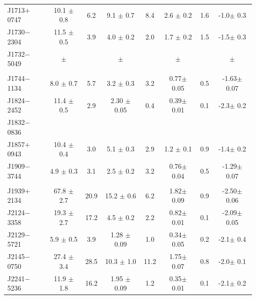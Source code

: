 \documentclass[useAMS,usenatbib]{mn2e}
\begin{document}
\begin{table}
\begin{tabular}{lccccccc}
 J1713$+$0747  &  10.1 $\pm$ 0.8  &  6.2   &  9.1  $\pm$ 0.7  &  8.4  &  2.6 $\pm$ 0.2  &  1.6  &  -1.0$\pm$ 0.3    \\
 J1730$-$2304  &  11.5 $\pm$ 0.5  &  3.9   &  4.0  $\pm$ 0.2  &  2.0  &  1.7 $\pm$ 0.2  &  1.5  &  -1.5$\pm$ 0.3    \\
 J1732$-$5049  &    $\pm$  &    &   $\pm$  &    &   $\pm$  &    &  $\pm$    \\
               &	                &        &                  &       &                 &       &                 \\
 J1744$-$1134  &  8.0  $\pm$ 0.7  &  5.7   &  3.2  $\pm$ 0.3  &  3.2  &  0.77$\pm$ 0.05 &  0.5  &  -1.63$\pm$ 0.07    \\
 J1824$-$2452  &  11.4 $\pm$ 0.5  &  2.9   &  2.30 $\pm$ 0.05 &  0.4  &  0.39$\pm$ 0.01 &  0.1  &  -2.3$\pm$ 0.2    \\
 J1832$-$0836  &	                &        &                  &       &                 &       &                 \\
 J1857$+$0943  &  10.4 $\pm$ 0.4  &  3.0   &  5.1  $\pm$ 0.3  &  2.9  &  1.2 $\pm$ 0.1  &  0.9  &  -1.4$\pm$ 0.2    \\
 J1909$-$3744  &  4.9  $\pm$ 0.3  &  3.1   &  2.5  $\pm$ 0.2  &  3.2  &  0.76$\pm$ 0.04 &  0.5  &  -1.29$\pm$ 0.07    \\
               &	                &        &                  &       &                 &       &                 \\
 J1939$+$2134  &  67.8 $\pm$ 2.7  &  20.9  &  15.2 $\pm$ 0.6  &  6.2  &  1.82$\pm$ 0.09 &  0.9  &  -2.50$\pm$ 0.06    \\
 J2124$-$3358  &  19.3 $\pm$ 2.7  &  17.2  &  4.5  $\pm$ 0.2  &  2.2  &  0.82$\pm$ 0.01 &  0.1  &  -2.09$\pm$ 0.05    \\
 J2129$-$5721  &  5.9  $\pm$ 0.5  &  3.9   &  1.28 $\pm$ 0.09 &  1.0  &  0.34$\pm$ 0.05 &  0.2  &  -2.1$\pm$ 0.4    \\
 J2145$-$0750  &  27.4 $\pm$ 3.4  &  28.5  &  10.3 $\pm$ 1.0  &  11.2 &  1.75$\pm$ 0.07 &  0.8  &  -2.0$\pm$ 0.1    \\
 J2241$-$5236  &  11.9 $\pm$ 1.8  &  16.2  &  1.95 $\pm$ 0.09 &  1.2  &  0.35$\pm$ 0.01 &  0.1  &  -2.1$\pm$ 0.2    \\

\end{tabular}
\end{table}
\end{document}
